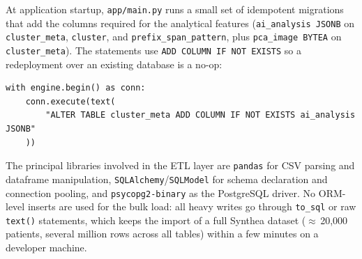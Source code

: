 At application startup, \texttt{app/main.py} runs a small set of idempotent migrations that add the columns required for the analytical features (\texttt{ai\_analysis JSONB} on \texttt{cluster\_meta}, \texttt{cluster}, and \texttt{prefix\_span\_pattern}, plus \texttt{pca\_image BYTEA} on \texttt{cluster\_meta}). The statements use \texttt{ADD COLUMN IF NOT EXISTS} so a redeployment over an existing database is a no-op:

\begin{verbatim}
with engine.begin() as conn:
    conn.execute(text(
        "ALTER TABLE cluster_meta ADD COLUMN IF NOT EXISTS ai_analysis JSONB"
    ))
\end{verbatim}

The principal libraries involved in the ETL layer are \texttt{pandas} for CSV parsing and dataframe manipulation, \texttt{SQLAlchemy}/\texttt{SQLModel} for schema declaration and connection pooling, and \texttt{psycopg2-binary} as the PostgreSQL driver. No ORM-level inserts are used for the bulk load: all heavy writes go through \texttt{to\_sql} or raw \texttt{text()} statements, which keeps the import of a full Synthea dataset (\(\approx\)\,20{,}000 patients, several million rows across all tables) within a few minutes on a developer machine.
